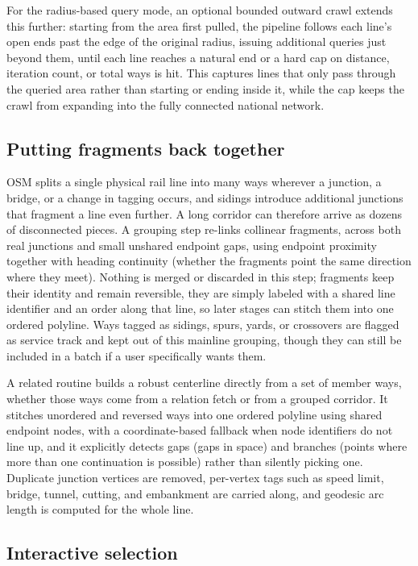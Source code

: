 For the radius-based query mode, an optional bounded outward crawl extends this further: starting from the area first pulled, the pipeline follows each line's open ends past the edge of the original radius, issuing additional queries just beyond them, until each line reaches a natural end or a hard cap on distance, iteration count, or total ways is hit. This captures lines that only pass through the queried area rather than starting or ending inside it, while the cap keeps the crawl from expanding into the fully connected national network.

\subsection{Putting fragments back together}

OSM splits a single physical rail line into many ways wherever a junction, a bridge, or a change in tagging occurs, and sidings introduce additional junctions that fragment a line even further. A long corridor can therefore arrive as dozens of disconnected pieces. A grouping step re-links collinear fragments, across both real junctions and small unshared endpoint gaps, using endpoint proximity together with heading continuity (whether the fragments point the same direction where they meet). Nothing is merged or discarded in this step; fragments keep their identity and remain reversible, they are simply labeled with a shared line identifier and an order along that line, so later stages can stitch them into one ordered polyline. Ways tagged as sidings, spurs, yards, or crossovers are flagged as service track and kept out of this mainline grouping, though they can still be included in a batch if a user specifically wants them.

A related routine builds a robust centerline directly from a set of member ways, whether those ways come from a relation fetch or from a grouped corridor. It stitches unordered and reversed ways into one ordered polyline using shared endpoint nodes, with a coordinate-based fallback when node identifiers do not line up, and it explicitly detects gaps (gaps in space) and branches (points where more than one continuation is possible) rather than silently picking one. Duplicate junction vertices are removed, per-vertex tags such as speed limit, bridge, tunnel, cutting, and embankment are carried along, and geodesic arc length is computed for the whole line.

\subsection{Interactive selection}

